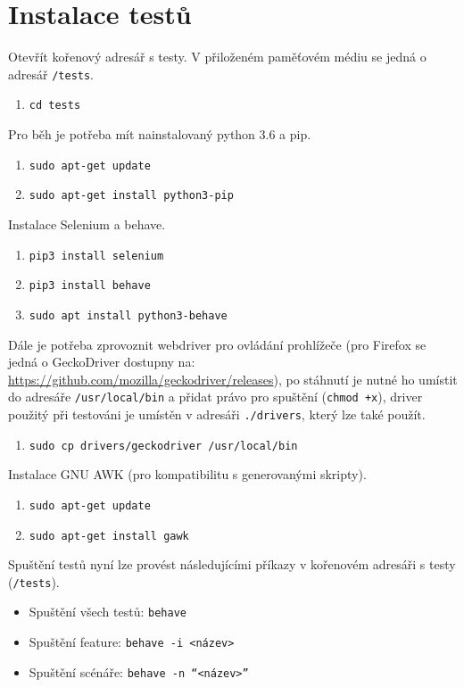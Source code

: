 \section{Instalace testů}
Otevřít kořenový adresář s testy. V přiloženém paměťovém médiu se jedná o adresář \texttt{/tests}.
\begin{enumerate}
    \item \texttt{cd tests}
\end{enumerate}
Pro běh je potřeba mít nainstalovaný python 3.6 a pip.
\begin{enumerate}[resume]
    \item \texttt{sudo apt-get update}
    \item \texttt{sudo apt-get install python3-pip}
\end{enumerate}
Instalace Selenium a behave.
\begin{enumerate}[resume]
    \item \texttt{pip3 install selenium}
    \item \texttt{pip3 install behave}
    \item \texttt{sudo apt install python3-behave}
\end{enumerate}
Dále je potřeba zprovoznit webdriver pro ovládání prohlížeče (pro Firefox se jedná o GeckoDriver dostupny na: \url{https://github.com/mozilla/geckodriver/releases}), po stáhnutí je nutné ho umístit do adresáře \texttt{/usr/local/bin} a přidat právo pro spuštění (\texttt{chmod +x}), driver použitý při testováni je umístěn v adresáři \texttt{./drivers}, který lze také použít.
\begin{enumerate}[resume]
    \item \texttt{sudo cp drivers/geckodriver /usr/local/bin}
\end{enumerate}
Instalace GNU AWK (pro kompatibilitu s generovanými skripty).
\begin{enumerate}[resume]
    \item \texttt{sudo apt-get update}
    \item \texttt{sudo apt-get install gawk}
\end{enumerate}
Spuštění testů nyní lze provést následujícími příkazy v kořenovém adresáři s testy (\texttt{/tests}).
\begin{itemize}
    \item Spuštění všech testů: \texttt{behave}
    \item Spuštění feature: \texttt{behave -i <název>}
    \item Spuštění scénáře: \texttt{behave -n ``<název>''}
\end{itemize}
